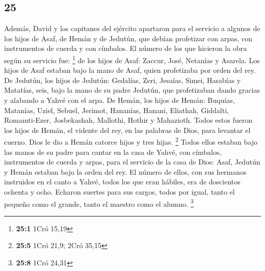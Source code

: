 \begin{paracol}{2}
\hypertarget{section-48}{%
\section{25}\label{section-48}}

 Además, David y los capitanes del ejército apartaron para
el servicio a algunos de los hijos de Asaf, de Hemán y de Jedutún, que
debían profetizar con arpas, con instrumentos de cuerda y con címbalos.
El número de los que hicieron la obra según su servicio fue: \footnote{\textbf{25:1}
  1Cró 15,19}  de los hijos de Asaf: Zaccur, José,
Netanías y Asarela. Los hijos de Asaf estaban bajo la mano de Asaf,
quien profetizaba por orden del rey.  De Jedutún, los
hijos de Jedutún: Gedalías, Zeri, Jesaías, Simei, Hasabías y Matatías,
seis, bajo la mano de su padre Jedutún, que profetizaban dando gracias y
alabando a Yahvé con el arpa.  De Hemán, los hijos de
Hemán: Buquías, Matanías, Uziel, Sebuel, Jerimot, Hananías, Hanani,
Eliathah, Giddalti, Romamti-Ezer, Josbekashah, Mallothi, Hothir y
Mahazioth.  Todos estos fueron los hijos de Hemán, el
vidente del rey, en las palabras de Dios, para levantar el cuerno. Dios
le dio a Hemán catorce hijos y tres hijas. \footnote{\textbf{25:5} 1Cró
  21,9; 2Cró 35,15}  Todos ellos estaban bajo las manos de
su padre para cantar en la casa de Yahvé, con címbalos, instrumentos de
cuerda y arpas, para el servicio de la casa de Dios: Asaf, Jedutún y
Hemán estaban bajo la orden del rey.  El número de ellos,
con sus hermanos instruidos en el canto a Yahvé, todos los que eran
hábiles, era de doscientos ochenta y ocho.  Echaron
suertes para sus cargos, todos por igual, tanto el pequeño como el
grande, tanto el maestro como el alumno. \footnote{\textbf{25:8} 1Cró
  24,31}


\end{paracol}
